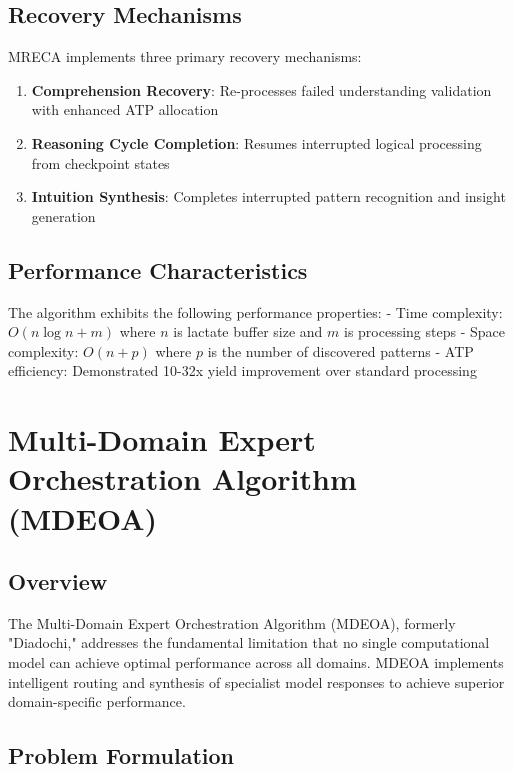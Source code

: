 \documentclass[12pt,a4paper]{article}
\begin{document}
\subsection{Recovery Mechanisms}

MRECA implements three primary recovery mechanisms:

\begin{enumerate}
\item \textbf{Comprehension Recovery}: Re-processes failed understanding validation with enhanced ATP allocation
\item \textbf{Reasoning Cycle Completion}: Resumes interrupted logical processing from checkpoint states
\item \textbf{Intuition Synthesis}: Completes interrupted pattern recognition and insight generation
\end{enumerate}

\subsection{Performance Characteristics}

The algorithm exhibits the following performance properties:
- Time complexity: $O(n \log n + m)$ where $n$ is lactate buffer size and $m$ is processing steps
- Space complexity: $O(n + p)$ where $p$ is the number of discovered patterns
- ATP efficiency: Demonstrated 10-32x yield improvement over standard processing

\section{Multi-Domain Expert Orchestration Algorithm (MDEOA)}

\subsection{Overview}

The Multi-Domain Expert Orchestration Algorithm (MDEOA), formerly "Diadochi," addresses the fundamental limitation that no single computational model can achieve optimal performance across all domains. MDEOA implements intelligent routing and synthesis of specialist model responses to achieve superior domain-specific performance.

\subsection{Problem Formulation}
\end{document}
